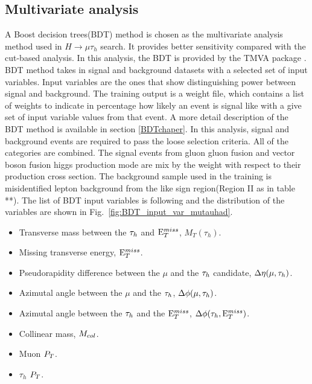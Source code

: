 \subsection{Multivariate analysis}
A Boost decision trees(BDT) method is chosen as the multivariate analysis method used in  $H\rightarrow\mu\tau_h$ search. It provides better sensitivity compared with the cut-based analysis. In this analysis, the BDT is provided by the TMVA package \cite{TMVAnote}. BDT method takes in signal and background datasets with a selected set of input variables. Input variables are the ones that show distinguishing power between signal and background.  The training output is a weight file, which contains a list of weights to indicate in percentage how likely an event is signal like with a give set of input variable values from that event. A more detail description of the BDT method is available in section \ref{BDTchaper}.  In this analysis, signal and background events are required to pass the loose selection criteria. All of the categories are combined. The signal events from gluon gluon fusion and vector boson fusion higgs production mode are mix by the weight with respect to their production cross section. The background sample used in the training is misidentified lepton background from the like sign region(Region II as in table **). The list of BDT input variables  is following and the distribution of the variables are shown in Fig.~\ref{fig:BDT_input_var_mutauhad}.

\begin{itemize}
\item Transverse mass between the $\tau_{h}$ and $\mathrm{E}_{T}^{miss}$, $M_{T}(\tau_{h})$.
\item Missing transverse energy, $\mathrm{E}_{T}^{miss}$.
\item Pseudorapidity difference between the $\mu$ and the $\tau_{h}$ candidate, $\Delta\eta(\mu, \tau_{h})$.
\item Azimutal angle between the $\mu$ and the $\tau_{h}$, $\Delta\phi (\mu,\tau_{h})$.
\item Azimutal angle between the $\tau_{h}$ and the $\mathrm{E}_{T}^{miss}$, $\Delta\phi(\tau_h,\mathrm{E}_{T}^{miss})$.
\item Collinear mass, $M_{col}$.
\item Muon $P_{T}$.
\item $\tau_h$ $P_{T}$.
\end{itemize}

